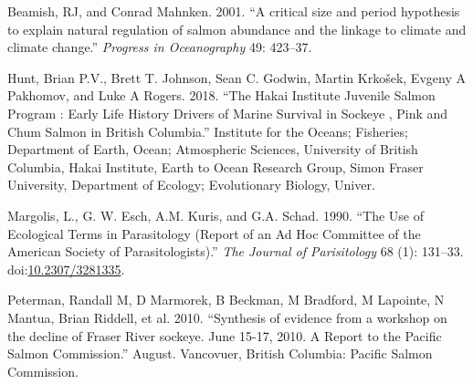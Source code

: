 \documentclass[fleqn,10pt]{wlpeerj} %
\begin{document}
\hypertarget{ref-Beamish2001}{}
Beamish, RJ, and Conrad Mahnken. 2001. ``A critical size and period
hypothesis to explain natural regulation of salmon abundance and the
linkage to climate and climate change.'' \emph{Progress in Oceanography}
49: 423--37.

\hypertarget{ref-Hunt2018}{}
Hunt, Brian P.V., Brett T. Johnson, Sean C. Godwin, Martin Krkošek,
Evgeny A Pakhomov, and Luke A Rogers. 2018. ``The Hakai Institute
Juvenile Salmon Program : Early Life History Drivers of Marine Survival
in Sockeye , Pink and Chum Salmon in British Columbia.'' Institute for
the Oceans; Fisheries; Department of Earth, Ocean; Atmospheric Sciences,
University of British Columbia, Hakai Institute, Earth to Ocean Research
Group, Simon Fraser University, Department of Ecology; Evolutionary
Biology, Univer.

\hypertarget{ref-Margolis1990}{}
Margolis, L., G. W. Esch, A.M. Kuris, and G.A. Schad. 1990. ``The Use of
Ecological Terms in Parasitology (Report of an Ad Hoc Committee of the
American Society of Parasitologists).'' \emph{The Journal of
Parisitology} 68 (1): 131--33.
doi:\href{https://doi.org/10.2307/3281335}{10.2307/3281335}.

\hypertarget{ref-Peterman2010}{}
Peterman, Randall M, D Marmorek, B Beckman, M Bradford, M Lapointe, N
Mantua, Brian Riddell, et al. 2010. ``Synthesis of evidence from a
workshop on the decline of Fraser River sockeye. June 15-17, 2010. A
Report to the Pacific Salmon Commission.'' August. Vancovuer, British
Columbia: Pacific Salmon Commission.
\end{document}
